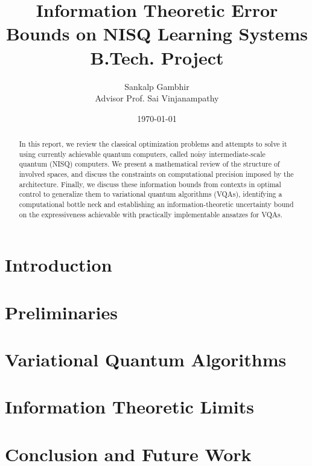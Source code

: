 \documentclass[
    paper=a4, 
    lang=en, 
    font=kpfonts,
    ptsize=12pt,
    titles=bf,
    hanging-titles=true,
    cleanlook, printdayoff, %
    final %
]
{skrapport}
\title{
    {\huge Information Theoretic Error Bounds on NISQ Learning Systems} \\
    {\large B.Tech. Project}
    }
\author[sgambhir@iitb.ac.in]{
    Sankalp Gambhir \\ 
    \vspace{1em}
        {
            \normalsize 
            \hspace{0.1em} 
            Advisor \hspace{0.5em}
            Prof. Sai Vinjanampathy
        }
    \vspace{-1.3em}
}
\date{\today}
\newcounter{notes}
\begin{document}
    \begin{titlepage}
        \maketitle
        \begin{abstract}
            In this report, we review the classical optimization problems and
            attempts to solve it using currently achievable quantum computers,
            called noisy intermediate-scale quantum (NISQ) computers. We present
            a mathematical review of the structure of involved spaces, and
            discuss the constraints on computational precision imposed by the
            architecture. Finally, we discuss these information bounds from
            contexts in optimal control to generalize them to variational
            quantum algorithms (VQAs), identifying a computational bottle neck
            and establishing an information-theoretic uncertainty bound on the
            expressiveness achievable with practically implementable ansatzes
            for VQAs.
        \end{abstract}

        \listofnotes
    \end{titlepage}

    \tableofcontents \pagebreak

    \section{Introduction}
        \label{sec:intro}
        
    
    \section{Preliminaries}
        \label{sec:prelim}
        

    \section{Variational Quantum Algorithms}
        \label{sec:vqa}
        
    
    \section{Information Theoretic Limits}
        \label{sec:infolimits}
        

    \section{Conclusion and Future Work}
        \label{sec:future}
        
\end{document}
